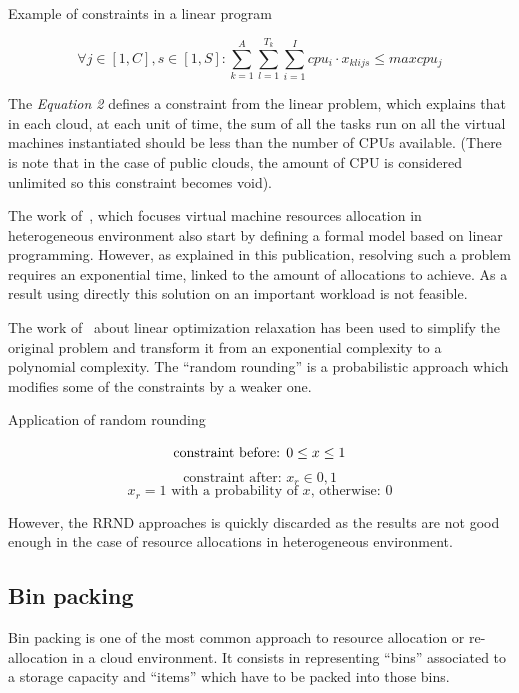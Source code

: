 \begin{figequation}
	\caption{Example of constraints in a linear program}
	\[
		\forall j \in [1,C], s \in [1,S]:
		\sum_{k=1}^{A} \sum_{l=1}^{T_k} \sum_{i=1}^{I} cpu_i \cdot x_{klijs} \leq maxcpu_j
	\]
\end{figequation}

The \textit{Equation 2} defines a constraint from the linear problem, which
explains that in each cloud, at each unit of time, the sum of all the tasks run
on all the virtual machines instantiated should be less than the number of CPUs
available.  (There is note that in the case of public clouds, the amount of CPU
is considered unlimited so this constraint becomes void).

\vspace{1em}

The work of~\cite*{allocationHeterogeneous}, which
focuses virtual machine resources allocation in heterogeneous
environment also start by defining a formal
model based on linear programming. However, as explained in this publication,
resolving such a problem requires an exponential time, linked to the amount of
allocations to achieve. As a result using directly this solution on an
important workload is not feasible.

\vspace{1em}

The work of~\cite*{mathsRrndlp} about linear optimization
relaxation has been used to simplify the original problem
and transform it from an exponential complexity to a polynomial complexity. The
“random rounding” is a probabilistic approach which modifies some of the
constraints by a weaker one.

\begin{figequation}
	\caption{Application of random rounding}
	\[
		\text{constraint before: } 0 \leq x \leq 1 \\
	\]
	\[
		\text{constraint after: } x_r \in {0, 1}
	\]
	\[
		x_r = 1 \text{ with a probability of $x$, otherwise: $0$}
	\]
\end{figequation}

However, the RRND approaches is quickly discarded as the results are not good
enough in the case of resource allocations in heterogeneous environment.

\subsection{Bin packing}

Bin packing is one of the most common approach to resource allocation or
re-allocation in a cloud environment. It consists in representing “bins”
associated to a storage capacity and “items” which have to be packed into
those bins.

